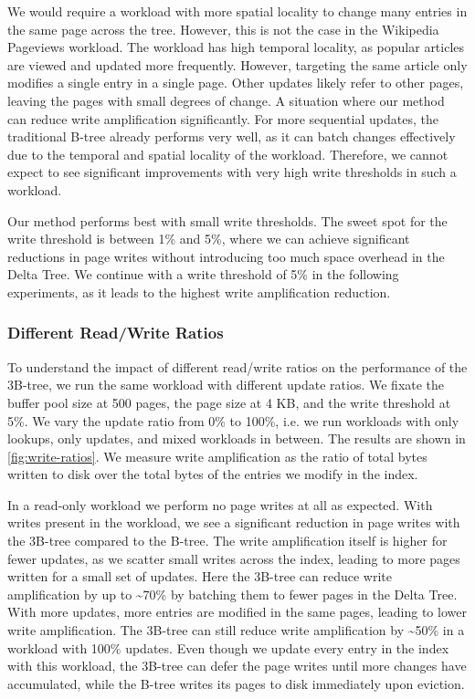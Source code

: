 We would require a workload with more spatial locality to change many entries in the same page across the tree.
However, this is not the case in the Wikipedia Pageviews workload.
The workload has high temporal locality, as popular articles are viewed and updated more frequently.
However, targeting the same article only modifies a single entry in a single page. 
Other updates likely refer to other pages, leaving the pages with small degrees of change.
A situation where our method can reduce write amplification significantly.
For more sequential updates, the traditional B-tree already performs very well, as it can batch changes effectively due to the temporal and spatial locality of the workload.
Therefore, we cannot expect to see significant improvements with very high write thresholds in such a workload.

Our method performs best with small write thresholds.
The sweet spot for the write threshold is between 1\% and 5\%, where we can achieve significant reductions in page writes without introducing too much space overhead in the Delta Tree.
We continue with a write threshold of 5\% in the following experiments, as it leads to the highest write amplification reduction.

\subsubsection*{Different Read/Write Ratios}
To understand the impact of different read/write ratios on the performance of the 3B-tree, we run the same workload with different update ratios.
We fixate the buffer pool size at 500 pages, the page size at 4 KB, and the write threshold at 5\%.
We vary the update ratio from 0\% to 100\%, i.e. we run workloads with only lookups, only updates, and mixed workloads in between.
The results are shown in \autoref{fig:write-ratios}.
We measure write amplification as the ratio of total bytes written to disk over the total bytes of the entries we modify in the index.

In a read-only workload we perform no page writes at all as expected.
With writes present in the workload, we see a significant reduction in page writes with the 3B-tree compared to the B-tree.
The write amplification itself is higher for fewer updates, as we scatter small writes across the index, leading to more pages written for a small set of updates.
Here the 3B-tree can reduce write amplification by up to \textasciitilde70\% by batching them to fewer pages in the Delta Tree.
With more updates, more entries are modified in the same pages, leading to lower write amplification.
The 3B-tree can still reduce write amplification by \textasciitilde50\% in a workload with 100\% updates.
Even though we update every entry in the index with this workload, the 3B-tree can defer the page writes until more changes have accumulated, while the B-tree writes its pages to disk immediately upon eviction.

